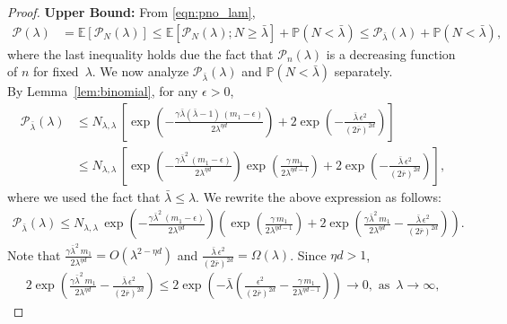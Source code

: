 \documentclass[11pt]{article}
\newcommand{\pp}{\mathbb{P}}
\newcommand{\ee}{\mathbb{E}}
\newcommand{\rbdd}{\overline{r}}
\newcommand{\lt}{\left}
\newcommand{\rt}{\right}
\newcommand{\pno}{\mathcal{P}(\lambda)}
\newcommand{\pnon}{\mathcal{P}_n(\lambda)}
\begin{document}
\begin{appendices}
\begin{proof}
\noindent
{\bf Upper Bound:}
From \eqref{eqn:pno_lam},
\begin{align}
\pno  &= \ee [\mathcal{P}_N(\lambda)]\leq \ee[\mathcal{P}_N(\lambda); N \geq \bar{\lambda}] + \pp(N < \bar{\lambda})
         \leq \mathcal{P}_{\bar{\lambda}}\lt(\lambda\rt) + \pp(N < \bar{\lambda}),\label{eqn:pno-upper-temp}
\end{align}
where the last inequality holds due the fact that $\pnon$ is a decreasing function of $n$ for fixed~$\lambda$.
We now analyze $\mathcal{P}_{\bar{\lambda}}\lt(\lambda\rt)$ and $\pp(N < \bar{\lambda})$ separately.\\

By Lemma~\ref{lem:binomial}, for any $\epsilon > 0$,
\begin{align*}
   \mathcal{P}_{\bar{\lambda}}\lt(\lambda\rt)&\leq N_{\lambda, \lambda}\, \lt[\exp\left( - \frac{\gamma \bar{\lambda}(\bar{\lambda} - 1)\, (m_1 - \epsilon)}{2\lambda^{\eta d}} \right) + 2\exp\left( - \frac{\bar{\lambda}\,\epsilon^2}{(2\rbdd)^{2d}}\right) \rt]\\
                                           &\leq N_{\lambda, \lambda}\,\lt[\exp\left( - \frac{\gamma \bar{\lambda}^2\, (m_1 - \epsilon)}{2\lambda^{\eta d}} \right) \exp\left( \frac{\gamma \, m_1}{2\lambda^{\eta d -1}} \right) + 2\exp\left( - \frac{\bar{\lambda}\,\epsilon^2}{(2\rbdd)^{2d}}\right) \rt],
\end{align*}
where we used the fact that $\bar{\lambda} \leq \lambda$. We rewrite the above expression as follows:
\begin{align*}
   \mathcal{P}_{\bar{\lambda}}\lt(\lambda\rt)\leq N_{\lambda, \lambda}\,\exp\left( - \frac{\gamma \bar{\lambda}^2\, (m_1 - \epsilon)}{2\lambda^{\eta d}} \right)\lt(\exp\left( \frac{\gamma \, m_1}{2\lambda^{\eta d -1}} \right)  + 2\exp\left( \frac{\gamma \bar{\lambda}^2\, m_1}{2\lambda^{\eta d}}- \frac{\bar{\lambda}\,\epsilon^2}{(2\rbdd)^{2d}}\right) \rt).
\end{align*}
Note that $\frac{\gamma \bar{\lambda}^2\, m_1}{2\lambda^{\eta d}} = O\lt( \lambda^{2-\eta d}\rt)$ and $\frac{\bar{\lambda}\,\epsilon^2}{(2\rbdd)^{2d}} = \Omega\lt(\lambda \rt)$.
Since $\eta d > 1$,
\begin{align}
\label{eqn:delta1}
 2\exp\left( \frac{\gamma \bar{\lambda}^2\, m_1}{2\lambda^{\eta d}}- \frac{\bar{\lambda}\,\epsilon^2}{(2\rbdd)^{2d}}\right) \leq 2\exp\left( - \bar{\lambda} \lt( \frac{\epsilon^2}{(2\rbdd)^{2d}} - \frac{\gamma \, m_1}{2\lambda^{\eta d  -1}}\rt)\right)
                                                                                                                        \longrightarrow 0, \text{ as }\,  \lambda \rightarrow \infty,

\end{align}
\end{proof}
\end{appendices}
\end{document}
